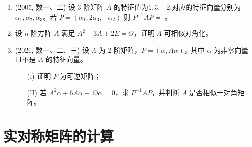 \documentclass[12pt, a4paper, oneside, UTF8]{ctexbook}
\begin{document}
\begin{enumerate}
    \item (2005, 数一、二) 设 3 阶矩阵 $A$ 的特征值为$1, 3, -2$,对应的特征向量分别为 $\alpha_1, \alpha_2, \alpha_3$。若
    $P = (\alpha_1, 2\alpha_3, -\alpha_2)$
    则 $P^{-1}AP = $ \underline{\hspace{3cm}}。
    
    \begin{solution}
    \newpage
    \end{solution}
    
    \item 设 $n$ 阶方阵 $A$ 满足 $A^2 - 3A + 2E = O$，证明 $A$ 可相似对角化。
    
    \begin{solution}
    \newpage
    \end{solution}
    
    \item (2020, 数一、二、三) 设 $A$ 为 2 阶矩阵，$P = (\alpha, A\alpha)$，其中 $\alpha$ 为非零向量且不是 $A$ 的特征向量。
    \begin{enumerate}
        \item [(I)] 证明 $P$ 为可逆矩阵；
        \item [(II)] 若 $A^2\alpha + 6A\alpha - 10\alpha = 0$，求 $P^{-1}AP$，并判断 $A$ 是否相似于对角矩阵。
    \end{enumerate}
    
    \begin{solution}
    \newpage
    \end{solution}
\end{enumerate}

\section{实对称矩阵的计算}
\end{document}
